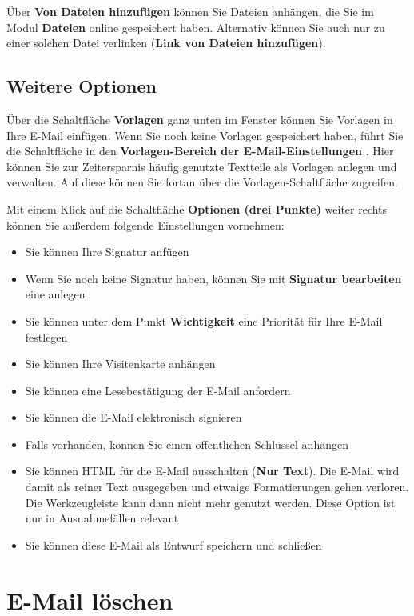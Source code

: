 \documentclass[
  letterpaper,
  DIV=11,
  numbers=noendperiod]{scrreprt}
\providecommand{\tightlist}{%
  \setlength{\itemsep}{0pt}\setlength{\parskip}{0pt}}\usepackage{longtable,booktabs,array}
\begin{document}
Über \textbf{Von Dateien hinzufügen} können Sie Dateien anhängen, die
Sie im Modul \textbf{Dateien} online gespeichert haben. Alternativ
können Sie auch nur zu einer solchen Datei verlinken (\textbf{Link von
Dateien hinzufügen}).

\subsection{Weitere Optionen}\label{weitere-optionen}

Über die Schaltfläche \textbf{Vorlagen} ganz unten im Fenster können Sie
Vorlagen in Ihre E-Mail einfügen. Wenn Sie noch keine Vorlagen
gespeichert haben, führt Sie die Schaltfläche in den
\textbf{Vorlagen-Bereich der E-Mail-Einstellungen} . Hier können Sie zur
Zeitersparnis häufig genutzte Textteile als Vorlagen anlegen und
verwalten. Auf diese können Sie fortan über die Vorlagen-Schaltfläche
zugreifen.

Mit einem Klick auf die Schaltfläche \textbf{Optionen (drei Punkte)}
weiter rechts können Sie außerdem folgende Einstellungen vornehmen:

\begin{itemize}
\tightlist
\item
  Sie können Ihre Signatur anfügen
\item
  Wenn Sie noch keine Signatur haben, können Sie mit \textbf{Signatur
  bearbeiten} eine anlegen
\item
  Sie können unter dem Punkt \textbf{Wichtigkeit} eine Priorität für
  Ihre E-Mail festlegen
\item
  Sie können Ihre Visitenkarte anhängen
\item
  Sie können eine Lesebestätigung der E-Mail anfordern
\item
  Sie können die E-Mail elektronisch signieren
\item
  Falls vorhanden, können Sie einen öffentlichen Schlüssel anhängen
\item
  Sie können HTML für die E-Mail ausschalten (\textbf{Nur Text}). Die
  E-Mail wird damit als reiner Text ausgegeben und etwaige
  Formatierungen gehen verloren. Die Werkzeugleiste kann dann nicht mehr
  genutzt werden. Diese Option ist nur in Ausnahmefällen relevant
\item
  Sie können diese E-Mail als Entwurf speichern und schließen
\end{itemize}

\section{E-Mail löschen}\label{e-mail-luxf6schen}
\end{document}
